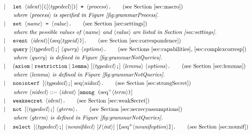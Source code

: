 \documentclass{book}
\newcommand{\nonterm}[1]{\langle\mathit{#1}\rangle}
\newcommand{\seq}[1]{\textrm{seq}\nonterm{#1}}
\newcommand{\neseq}[1]{\textrm{seq}^+\nonterm{#1}}
\begin{document}
\begin{figure}
\begin{align*}
&\mid\phantom{:=}
        \texttt{let } \nonterm{ident}[\texttt{(}[\nonterm{typedecl}]\texttt{)}]\texttt{ = }\nonterm{process}\texttt{.}\tag{see Section~\ref{sec:macro}}\\
		&\qquad\emph{where }\nonterm{process}\emph{ is specified in Figure~\ref{fig:grammarProcess}.}\\
&\mid\phantom{:=}
        \texttt{set } \nonterm{name}\texttt{ = }\nonterm{value}\texttt{.}\tag{see Section~\ref{sec:settings}}\\
		&\qquad\emph{where the possible values of }\nonterm{name}\emph{ and }\nonterm{value}\emph{ are listed in Section~\ref{sec:settings}.}\\
&\mid\phantom{:=}
        \texttt{event } \nonterm{ident}[\texttt{(}\seq{typeid}\texttt{)}]\texttt{.}\tag{see Section~\ref{sec:correspondence}}\\
&\mid\phantom{:=}
        \texttt{query}\  [\nonterm{typedecl}\texttt{;}]\ \nonterm{query}\ \nonterm{options}\texttt{.}\tag{see Sections~\ref{sec:capabilities},~\ref{sec:complexcorresp}}\\
&\qquad\emph{where }\nonterm{query}\emph{ is defined in Figure~\ref{fig:grammarNotQueries}.}\\
&\mid\phantom{:=}
        (\texttt{axiom} \mid \texttt{restriction} \mid \texttt{lemma})\  [\nonterm{typedecl}\texttt{;}]\ \nonterm{lemma}\ \nonterm{options}\texttt{.}\tag{see Section~\ref{sec:lemmas}}\\
&\qquad\emph{where }\nonterm{lemma}\emph{ is defined in Figure~\ref{fig:grammarNotQueries}.}\\
&\mid\phantom{:=}
        \texttt{noninterf } [\nonterm{typedecl}\texttt{;}]\ \seq{nidecl}\texttt{.}\tag{see Section~\ref{sec:strongSecret}}\\
&\qquad\emph{where }\nonterm{nidecl} ::= \nonterm{ident}\ [\texttt{among } \texttt{(} \neseq{term} \texttt{)}]\\
&\mid\phantom{:=}
        \texttt{weaksecret } \nonterm{ident}\texttt{.}\tag{see Section~\ref{sec:weakSecret}}\\
&\mid\phantom{:=}
        \texttt{not } [\nonterm{typedecl}\texttt{;}]\ \nonterm{gterm}\texttt{.}\tag{see Section~\ref{sec:secrecyassumptions}}\\
&\qquad\emph{where }\nonterm{gterm}\emph{ is defined in Figure~\ref{fig:grammarNotQueries}.}\\
&\mid\phantom{:=}
        \texttt{select } [\nonterm{typedecl}\texttt{;}]\ \nonterm{nounifdecl}\textrm{ }[\texttt{/}\nonterm{int}]\ [\texttt{[}\neseq{nounifoption}\texttt{]}]\texttt{.}\tag{see Section~\ref{sec:nounif}}\\

\end{align*}
\end{figure}
\end{document}
